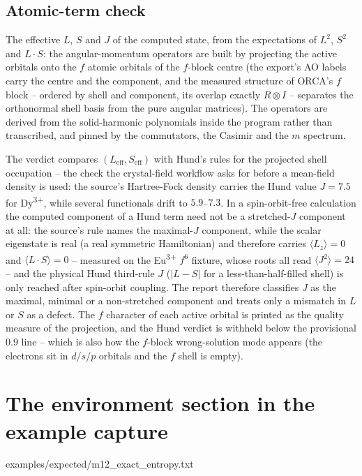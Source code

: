 \subsection*{Atomic-term check}

The effective $L$, $S$ and $J$ of the computed state, from the expectations of
$L^2$, $S^2$ and $L\cdot S$: the angular-momentum operators are built by
projecting the active orbitals onto the $f$ atomic orbitals of the $f$-block
centre (the export's AO labels carry the centre and the component, and the
measured structure of ORCA's $f$ block -- ordered by shell and component, its
overlap exactly $R\otimes I$ -- separates the orthonormal shell basis from the
pure angular matrices). The operators are derived from the solid-harmonic
polynomials inside the program rather than transcribed, and pinned by the
commutators, the Casimir and the $m$ spectrum.

The verdict compares $(L_{\mathrm{eff}}, S_{\mathrm{eff}})$ with Hund's rules
for the projected shell occupation -- the check the crystal-field workflow asks
for before a mean-field density is used: the source's Hartree-Fock density
carries the Hund value $J = 7.5$ for Dy\textsuperscript{3+}, while several
functionals drift to $5.9$--$7.3$. In a spin-orbit-free calculation the
computed component of a Hund term need not be a stretched-$J$ component at
all: the source's rule names the maximal-$J$ component, while the scalar
eigenstate is real (a real symmetric Hamiltonian) and therefore carries
$\langle L_z \rangle = 0$ and $\langle L \cdot S \rangle = 0$ -- measured on
the Eu\textsuperscript{3+} $f^6$ fixture, whose roots all read
$\langle J^2 \rangle = 24$ -- and the physical Hund third-rule $J$
($|L - S|$ for a less-than-half-filled shell) is only reached after
spin-orbit coupling. The report therefore classifies $J$ as the maximal,
minimal or a non-stretched component and treats only a mismatch in $L$ or $S$
as a defect. The $f$ character of each active orbital is printed as the quality
measure of the projection, and the Hund verdict is withheld below the
provisional $0.9$ line -- which is also how the $f$-block wrong-solution mode
appears (the electrons sit in $d$/$s$/$p$ orbitals and the $f$ shell is empty).

\section{The environment section in the example capture}


  {examples/expected/m12_exact_entropy.txt}

